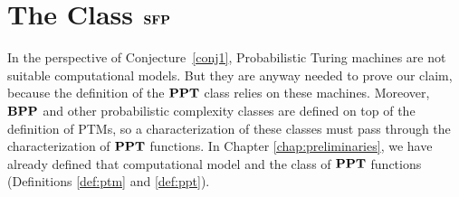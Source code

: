 %
%













\section{The Class $\mathbf{SFP}$}\label{sec:SFP}
In the perspective of Conjecture~\ref{conj1},
Probabilistic Turing machines
are not suitable computational models.
But they are anyway needed to prove our claim,
because the definition of the $\mathbf{PPT}$ class
relies on these machines. Moreover,
$\mathbf{BPP}$ and other probabilistic complexity classes
are defined on top of the definition of PTMs,
so a characterization of these classes must pass through
the characterization of $\mathbf{PPT}$ functions. In Chapter
\ref{chap:preliminaries}, we have already
defined that computational model and the class of $\mathbf{PPT}$
functions (Definitions \ref{def:ptm} and \ref{def:ppt}).

